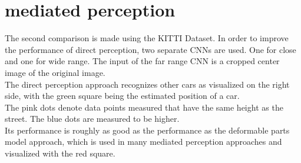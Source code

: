 \documentclass[11pt]{article}
\begin{document}
\section{mediated perception}

The second comparison is made using the KITTI Dataset. In order to improve the performance of direct perception, two separate CNNs are used. One for close and one for wide range. The input of the far range CNN is a cropped center image of the original image.\\

The direct perception approach recognizes other cars as visualized on the right side, with the green square being the estimated position of a car. \\
The pink dots denote data points measured that have the same height as the street. The blue dots are measured to be higher.\\

Its performance is roughly as good as the performance as the deformable parts model approach, which is used in many mediated perception approaches and visualized with the red square.
\end{document}
